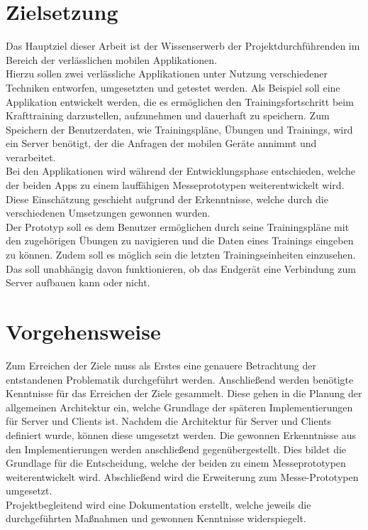 \section{Zielsetzung}
\label{sec:zielsetzung}
Das Hauptziel dieser Arbeit ist der Wissenserwerb der Projektdurchführenden im Bereich der verlässlichen mobilen Applikationen. \\
Hierzu sollen zwei verlässliche Applikationen unter Nutzung verschiedener Techniken entworfen, umgesetzten und getestet werden. Als Beispiel soll eine Applikation entwickelt werden, die es ermöglichen den Trainingsfortschritt beim Krafttraining darzustellen, aufzunehmen und dauerhaft zu speichern. Zum Speichern der Benutzerdaten, wie Trainingspläne, Übungen und Trainings, wird ein Server benötigt, der die Anfragen der mobilen Geräte annimmt und verarbeitet.\\
Bei den Applikationen wird während der Entwicklungsphase entschieden, welche der beiden Apps zu einem lauffähigen Messeprototypen weiterentwickelt wird. Diese Einschätzung geschieht aufgrund der Erkenntnisse, welche durch die verschiedenen Umsetzungen gewonnen wurden.\\
Der Prototyp soll es dem Benutzer ermöglichen durch seine Trainingspläne mit den zugehörigen Übungen zu navigieren und die Daten eines Trainings eingeben zu können. Zudem soll es möglich sein die letzten Trainingseinheiten einzusehen. Das soll unabhängig davon funktionieren, ob das Endgerät eine Verbindung zum Server aufbauen kann oder nicht.
\section{Vorgehensweise}
\label{sec:vorgehensweise}
Zum Erreichen der Ziele muss als Erstes eine genauere Betrachtung der entstandenen Problematik durchgeführt werden. Anschließend werden benötigte Kenntnisse für das Erreichen der Ziele gesammelt. Diese gehen in die Planung der allgemeinen Architektur ein, welche Grundlage der späteren Implementierungen für Server und Clients ist. Nachdem die Architektur für Server und Clients definiert wurde, können diese umgesetzt werden. Die gewonnen Erkenntnisse aus den Implementierungen werden anschließend gegenübergestellt. Dies bildet die Grundlage für die Entscheidung, welche der beiden zu einem Messeprototypen weiterentwickelt wird. Abschließend wird die Erweiterung zum Messe-Prototypen umgesetzt.\\
Projektbegleitend wird eine Dokumentation erstellt, welche jeweils die durchgeführten Maßnahmen und gewonnen Kenntnisse widerspiegelt. 
